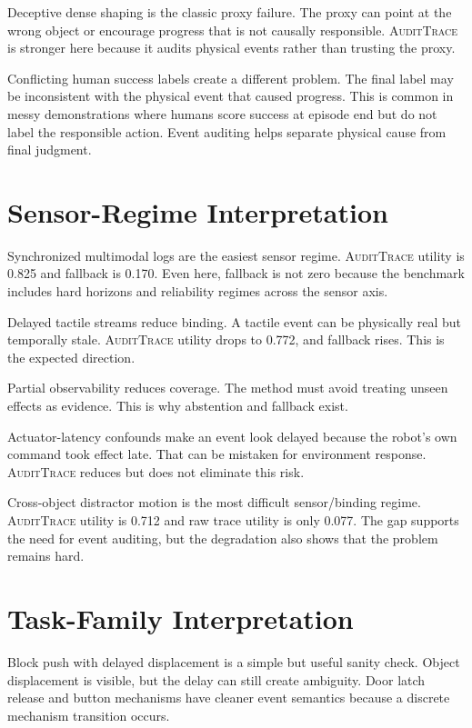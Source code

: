 \documentclass{article}
\newcommand{\method}{\textsc{AuditTrace}\xspace}
\begin{document}
Deceptive dense shaping is the classic proxy failure. The proxy can point at the wrong object or encourage progress that is not causally responsible. \method is stronger here because it audits physical events rather than trusting the proxy.

Conflicting human success labels create a different problem. The final label may be inconsistent with the physical event that caused progress. This is common in messy demonstrations where humans score success at episode end but do not label the responsible action. Event auditing helps separate physical cause from final judgment.

\section{Sensor-Regime Interpretation}

Synchronized multimodal logs are the easiest sensor regime. \method utility is 0.825 and fallback is 0.170. Even here, fallback is not zero because the benchmark includes hard horizons and reliability regimes across the sensor axis.

Delayed tactile streams reduce binding. A tactile event can be physically real but temporally stale. \method utility drops to 0.772, and fallback rises. This is the expected direction.

Partial observability reduces coverage. The method must avoid treating unseen effects as evidence. This is why abstention and fallback exist.

Actuator-latency confounds make an event look delayed because the robot's own command took effect late. That can be mistaken for environment response. \method reduces but does not eliminate this risk.

Cross-object distractor motion is the most difficult sensor/binding regime. \method utility is 0.712 and raw trace utility is only 0.077. The gap supports the need for event auditing, but the degradation also shows that the problem remains hard.

\section{Task-Family Interpretation}

Block push with delayed displacement is a simple but useful sanity check. Object displacement is visible, but the delay can still create ambiguity. Door latch release and button mechanisms have cleaner event semantics because a discrete mechanism transition occurs.
\end{document}
